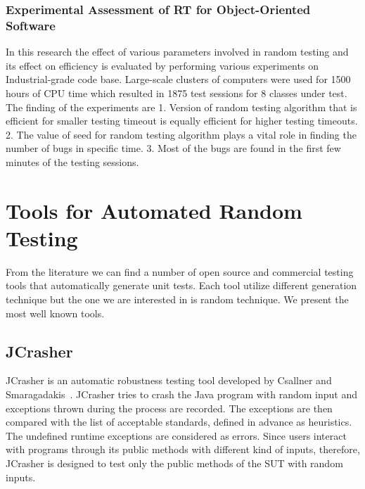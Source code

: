 \subsubsection{Experimental Assessment of RT for Object-Oriented Software}
In this research the effect of various parameters involved in random testing and its effect on efficiency is evaluated by performing various experiments on Industrial-grade code base. Large-scale clusters of computers were used for 1500 hours of CPU time which resulted in 1875 test sessions for 8 classes under test.~\cite{Ciupa2007} The finding of the experiments are 1. Version of random testing algorithm that is efficient for smaller testing timeout is equally efficient for higher testing timeouts. 2. The value of seed for random testing algorithm plays a vital role in finding the number of bugs in specific time. 3. Most of the bugs are found in the first few minutes of the testing sessions.


\section{Tools for Automated Random Testing}
From the literature we can find a number of open source and commercial testing tools that automatically generate unit tests. Each tool utilize different generation technique but the one we are interested in is random technique. We present the most well known tools.


\subsection{JCrasher}

JCrasher is an automatic robustness testing tool developed by Csallner and Smaragadakis~\cite{Pacheco2007b}. JCrasher tries to crash the Java program with random input and exceptions thrown during the process are recorded. The exceptions are then compared with the list of acceptable standards, defined in advance as heuristics. The undefined runtime exceptions are considered as errors. Since users interact with programs through its public methods with different kind of inputs, therefore, JCrasher is designed to test only the public methods of the SUT with random inputs.

